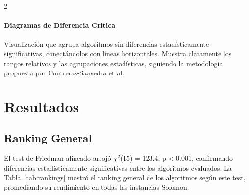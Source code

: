 \documentclass[10pt,a4paper]{extarticle}
\begin{document}
\begin{multicols}{2}
\paragraph{Diagramas de Diferencia Crítica} Visualización que agrupa algoritmos sin diferencias estadísticamente significativas, conectándolos con líneas horizontales. Muestra claramente los rangos relativos y las agrupaciones estadísticas, siguiendo la metodología propuesta por Contreras-Saavedra et al.

\section{Resultados}
\subsection{Ranking General}
El test de Friedman alineado arrojó $\chi^2$(15) = 123.4, p < 0.001, confirmando diferencias estadísticamente significativas entre los algoritmos evaluados. La Tabla~\ref{tab:rankings} mostró el ranking general de los algoritmos según este test, promediando su rendimiento en todas las instancias Solomon.

\end{multicols}
\end{document}
